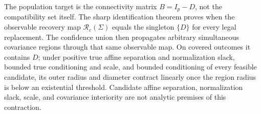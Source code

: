 The population target is the connectivity matrix \(B=I_p-D\), not the compatibility set itself. The sharp identification theorem proves when the observable recovery map \(\mathcal R_c(\Sigma)\) equals the singleton \(\{D\}\) for every legal replacement. The confidence union then propagates arbitrary simultaneous covariance regions through that same observable map. On covered outcomes it contains \(D\); under positive true affine separation and normalization slack, bounded true conditioning and scale, and bounded conditioning of every feasible candidate, its outer radius and diameter contract linearly once the region radius is below an existential threshold. Candidate affine separation, normalization slack, scale, and covariance interiority are not analytic premises of this contraction.